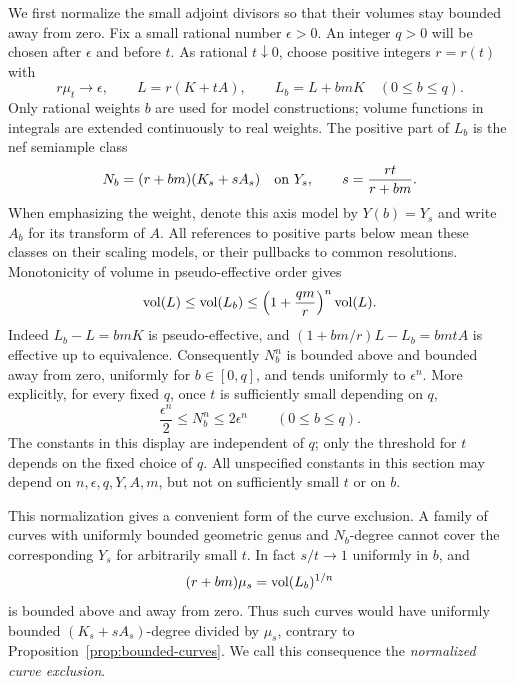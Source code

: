 We first normalize the small adjoint divisors so that their volumes
stay bounded away from zero.  Fix a small rational number \(\epsilon>0\).
An integer \(q>0\) will be chosen after \(\epsilon\) and before \(t\).
As rational \(t\downarrow0\),
choose positive integers \(r=r(t)\) with
\begin{equation}\label{jet:normalization}
 r\mu_t\longrightarrow\epsilon,\qquad
 L=r(K+tA),\qquad L_b=L+bmK\quad(0\le b\le q).
\end{equation}
Only rational weights \(b\) are used for model constructions;
volume functions in integrals are extended continuously to real weights.
The positive part of \(L_b\) is
the nef semiample class
\[
 N_b=(r+bm)(K_s+sA_s)
 \quad\hbox{on }Y_s,\qquad s=\frac{rt}{r+bm}.
\]
When emphasizing the weight, denote this axis model by \(Y(b)=Y_s\)
and write \(A_b\) for its transform of \(A\).
All references to positive parts below mean these classes on their
scaling models, or their pullbacks to common resolutions.  Monotonicity
of volume in pseudo-effective order gives
\begin{equation}\label{jet:volume-comparison}
 \operatorname{vol}(L)\le \operatorname{vol}(L_b)\le
 \left(1+\frac{qm}{r}\right)^n\operatorname{vol}(L).
\end{equation}
Indeed \(L_b-L=bmK\) is pseudo-effective, and
\((1+bm/r)L-L_b=bmtA\) is effective up to equivalence.
Consequently \(N_b^n\) is bounded above and bounded away from zero,
uniformly for \(b\in[0,q]\), and tends uniformly to \(\epsilon^n\).
More explicitly, for every fixed \(q\), once \(t\) is sufficiently
small depending on \(q\),
\begin{equation}\label{jet:uniform-normalized-volume}
 \frac{\epsilon^n}{2}\le N_b^n\le2\epsilon^n
 \qquad(0\le b\le q).
\end{equation}
The constants in this display are independent of \(q\); only the
threshold for \(t\) depends on the fixed choice of \(q\).
All unspecified constants in this section may depend on
\(n,\epsilon,q,Y,A,m\), but not on sufficiently small \(t\) or on \(b\).

This normalization gives a convenient form of the curve exclusion.
A family of curves with uniformly bounded geometric genus and
\(N_b\)-degree cannot cover the corresponding \(Y_s\) for arbitrarily
small \(t\).  In fact \(s/t\to1\) uniformly in \(b\), and
\[
 (r+bm)\mu_s=\operatorname{vol}(L_b)^{1/n}
\]
is bounded above and away from zero.  Thus such curves would have
uniformly bounded \((K_s+sA_s)\)-degree divided by \(\mu_s\), contrary
to Proposition~\ref{prop:bounded-curves}.  We call this consequence the
\emph{normalized curve exclusion}.

